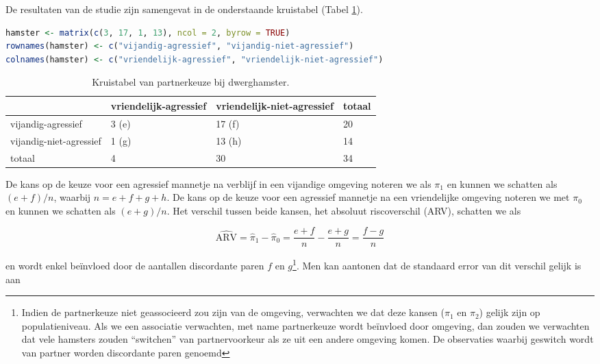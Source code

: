 \documentclass[
  12pt,dutch,coursenotes]{book}
\theoremstyle{definition}
\theoremstyle{definition}
\theoremstyle{definition}
\theoremstyle{definition}
\theoremstyle{remark}
\begin{document}
De resultaten van de studie zijn samengevat in de onderstaande kruistabel (Tabel \ref{tab:catHamster}).

\begin{lstlisting}[language=R]
hamster <- matrix(c(3, 17, 1, 13), ncol = 2, byrow = TRUE)
rownames(hamster) <- c("vijandig-agressief", "vijandig-niet-agressief")
colnames(hamster) <- c("vriendelijk-agressief", "vriendelijk-niet-agressief")
\end{lstlisting}

\begin{table}

\caption{\label{tab:catHamster}Kruistabel van partnerkeuze bij dwerghamster.}
\centering
\begin{tabular}[t]{llll}
\toprule
  & vriendelijk-agressief & vriendelijk-niet-agressief & totaal\\
\midrule
vijandig-agressief & 3 (e) & 17 (f) & 20\\
vijandig-niet-agressief & 1 (g) & 13 (h) & 14\\
totaal & 4 & 30 & 34\\
\bottomrule
\end{tabular}
\end{table}

De kans op de keuze voor een agressief mannetje na verblijf in een vijandige omgeving noteren we als \(\pi_1\) en kunnen we schatten als \((e+f)/n\), waarbij \(n=e+f+g+h\). De kans op
de keuze voor een agressief mannetje na een vriendelijke omgeving noteren we met \(\pi_0\)
en kunnen we schatten als \((e+g)/n\). Het verschil tussen beide kansen,
het absoluut riscoverschil (ARV), schatten we als

\begin{equation*}
\widehat{\text{ARV}}=\hat\pi_1-\hat\pi_0=\frac{e+f}{n}-\frac{e+g}{n}=\frac{f-g}{n}
\end{equation*}

en wordt enkel beïnvloed door de aantallen discordante paren \(f\) en \(g\)\footnote{Indien de partnerkeuze niet geassocieerd zou zijn van de omgeving, verwachten we dat deze kansen (\(\pi_1\) en \(\pi_2\)) gelijk zijn op populatieniveau. Als we een associatie verwachten, met name partnerkeuze wordt beïnvloed door omgeving, dan zouden we verwachten dat vele hamsters zouden ``switchen'' van partnervoorkeur als ze uit een andere omgeving komen. De observaties waarbij geswitch wordt van partner worden discordante paren genoemd}. Men kan aantonen dat de standaard error van dit verschil gelijk is aan
\end{document}
